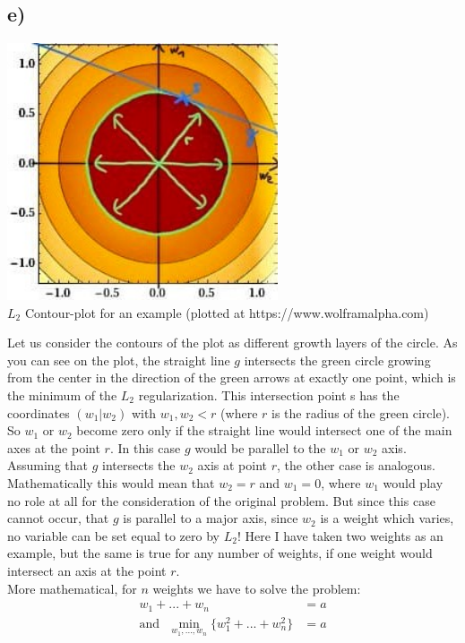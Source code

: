 \documentclass[a4paper]{article}
\begin{document}
    \subsection*{e)}
        \begin{center}
            \includegraphics[width=80mm]{Assignment 7/L2(3).jpg}\\
            \caption{$L_2$ Contour-plot for an example (plotted at https://www.wolframalpha.com)}
        \end{center}
        Let us consider the contours of the plot as different growth layers of the circle.
        As you can see on the plot, the straight line $g$ intersects the green circle growing from the center in the direction of the green arrows at exactly one point, which is the minimum of the $L_2$ regularization. 
        This intersection point s has the coordinates $(w_1|w_2)$ with $w_1,w_2 < r$ (where $r$ is the radius of the green circle).
        So $w_1$ or $w_2$ become zero only if the straight line would intersect one of the main axes at the point $r$.
        In this case $g$ would be parallel to the $w_1$ or $w_2$ axis.
        Assuming that $g$ intersects the $w_2$ axis at point $r$, the other case is analogous.
        Mathematically this would mean that $w_2 = r$ and $w_1=0$, where $w_1$ would play no role at all for the consideration of the original problem.
        But since this case cannot occur, that $g$ is parallel to a major axis, since $w_2$ is a weight which varies, no variable can be set equal to zero by $L_2$!
        Here I have taken two weights as an example, but the same is true for any number of weights, if one weight would intersect an axis at the point $r$.\\
        More mathematical, for $n$ weights we have to solve the problem:
        \begin{align}
            w_1 + ... + w_n &= a\\
            \text{and}\ \ \ \min_{w_1,...,w_n}\{w^2_1 + ... + w^2_n\} &= a
        \end{align}\ \\
\end{document}
